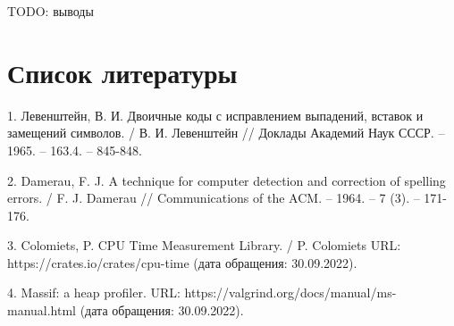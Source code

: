 \documentclass{report}
\begin{document}
TODO: выводы

\chapter*{Список литературы}

1. Левенштейн, В. И. Двоичные коды с исправлением выпадений,
вставок и замещений символов. / В. И. Левенштейн // Доклады
Академий Наук СССР. -- 1965. -- 163.4. -- 845-848.

2. Damerau, F. J. A technique for computer detection and correction
of spelling errors. / F. J. Damerau // Communications of the ACM.
-- 1964. -- 7 (3). -- 171-176.

3. Colomiets, P. CPU Time Measurement Library. / P. Colomiets
URL: https://crates.io/crates/cpu-time
(дата обращения: 30.09.2022).

4. Massif: a heap profiler.
URL: https://valgrind.org/docs/manual/ms-manual.html
(дата обращения: 30.09.2022).
\end{document}
